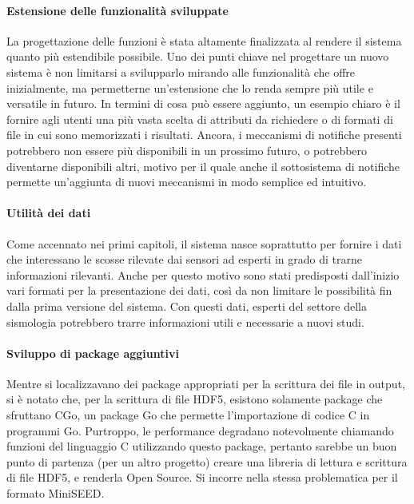 \paragraph{Estensione delle funzionalità sviluppate}
La progettazione delle funzioni è stata altamente finalizzata al rendere il sistema quanto più estendibile possibile. Uno dei punti chiave nel progettare un nuovo sistema è non limitarsi a svilupparlo mirando alle funzionalità che offre inizialmente, ma permetterne un'estensione che lo renda sempre più utile e versatile in futuro. In termini di cosa può essere aggiunto, un esempio chiaro è il fornire agli utenti una più vasta scelta di attributi da richiedere o di formati di file in cui sono memorizzati i risultati. Ancora, i meccanismi di notifiche presenti potrebbero non essere più disponibili in un prossimo futuro, o potrebbero diventarne disponibili altri, motivo per il quale anche il sottosistema di notifiche permette un'aggiunta di nuovi meccanismi in modo semplice ed intuitivo.

\paragraph{Utilità dei dati}
Come accennato nei primi capitoli, il sistema nasce soprattutto per fornire i dati che interessano le scosse rilevate dai sensori ad esperti in grado di trarne informazioni rilevanti. Anche per questo motivo sono stati predisposti dall'inizio vari formati per la presentazione dei dati, così da non limitare le possibilità fin dalla prima versione del sistema. Con questi dati, esperti del settore della sismologia potrebbero trarre informazioni utili e necessarie a nuovi studi.

\paragraph{Sviluppo di package aggiuntivi}
Mentre si localizzavano dei package appropriati per la scrittura dei file in output, si è notato che, per la scrittura di file HDF5, esistono solamente package che sfruttano CGo, un package Go che permette l'importazione di codice C in programmi Go. Purtroppo, le performance degradano notevolmente chiamando funzioni del linguaggio C utilizzando questo package, pertanto sarebbe un buon punto di partenza (per un altro progetto) creare una libreria di lettura e scrittura di file HDF5, e renderla Open Source. Si incorre nella stessa problematica per il formato MiniSEED.